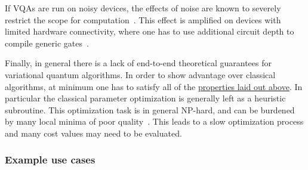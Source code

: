 \begin{refsection}
If VQAs are run on noisy devices, the effects of noise are known to severely restrict the scope for computation~\cite{aharonov1996limitations, benOr2013refrigerator, wang2020noise, franca2020limitations, dePalma2022limitations}. This effect is amplified on devices with limited hardware connectivity, where one has to use additional circuit depth to compile generic gates~\cite{franca2020limitations, wang2020noise}.

Finally, in general there is a lack of end-to-end theoretical guarantees for variational quantum algorithms. In order to show advantage over classical algorithms, at minimum one has to satisfy all of the \hyperref[sec:variational-roughoverview]{properties laid out above}. In particular the classical parameter optimization is generally left as a heuristic subroutine. This optimization task is in general NP-hard, and can be burdened by many local minima of poor quality~\cite{bittel2021training, anschuetz2022quantum}. This leads to a slow optimization process and many cost values may need to be evaluated. 


\subsubsection*{Example use cases}\label{sec:variational-examples}


\end{refsection}
